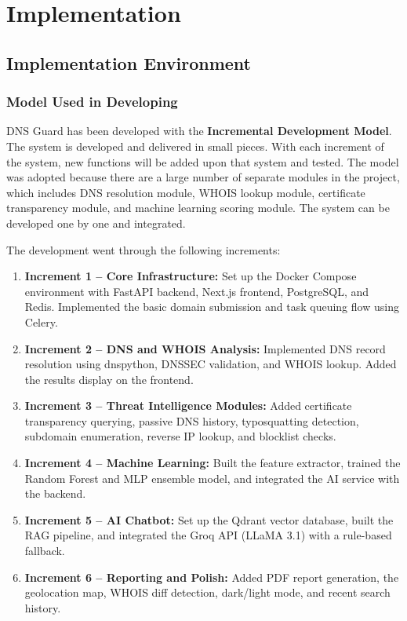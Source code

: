 \documentclass[12pt, a4paper, oneside]{report}
\begin{document}
\chapter*{Implementation}
\setcounter{chapter}{4}
\setcounter{section}{0}

\section{Implementation Environment}

\subsection{Model Used in Developing}

DNS Guard has been developed with the \textbf{Incremental Development Model}. The system is developed and delivered in small pieces. With each increment of the system, new functions will be added upon that system and tested. The model was adopted because there are a large number of separate modules in the project, which includes DNS resolution module, WHOIS lookup module, certificate transparency module, and machine learning scoring module. The system can be developed one by one and integrated.

The development went through the following increments:

\begin{enumerate}
    \item \textbf{Increment 1 -- Core Infrastructure:} Set up the Docker Compose environment with FastAPI backend, Next.js frontend, PostgreSQL, and Redis. Implemented the basic domain submission and task queuing flow using Celery.
    \item \textbf{Increment 2 -- DNS and WHOIS Analysis:} Implemented DNS record resolution using dnspython, DNSSEC validation, and WHOIS lookup. Added the results display on the frontend.
    \item \textbf{Increment 3 -- Threat Intelligence Modules:} Added certificate transparency querying, passive DNS history, typosquatting detection, subdomain enumeration, reverse IP lookup, and blocklist checks.
    \item \textbf{Increment 4 -- Machine Learning:} Built the feature extractor, trained the Random Forest and MLP ensemble model, and integrated the AI service with the backend.
    \item \textbf{Increment 5 -- AI Chatbot:} Set up the Qdrant vector database, built the RAG pipeline, and integrated the Groq API (LLaMA 3.1) with a rule-based fallback.
    \item \textbf{Increment 6 -- Reporting and Polish:} Added PDF report generation, the geolocation map, WHOIS diff detection, dark/light mode, and recent search history.
\end{enumerate}
\end{document}
